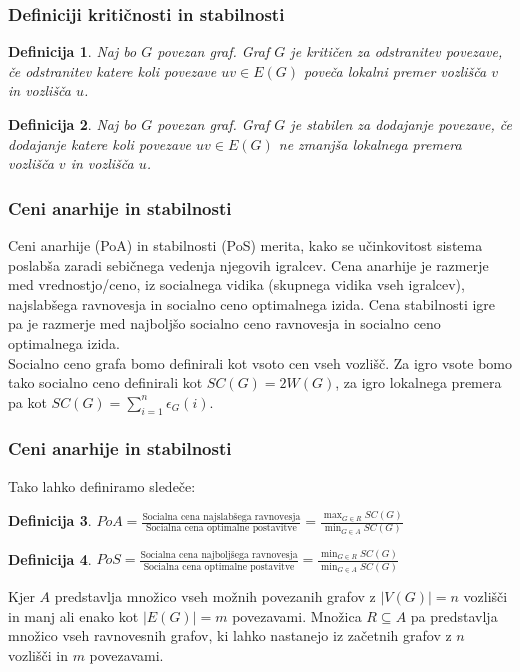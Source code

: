 \documentclass[12pt, hyperref={unicode}]{beamer}
\newtheorem{definicija}{Definicija}
\begin{document}
\begin{frame}
   
    \frametitle{Definiciji kritičnosti in stabilnosti}  
    \begin{definicija}
    Naj bo $G$ povezan graf. Graf $G$ je \textit{kritičen za odstranitev povezave},
    če odstranitev katere koli povezave $uv \in E(G)$ poveča lokalni premer vozlišča $v$ in vozlišča $u$.
    \end{definicija}
    
    \begin{definicija}
    Naj bo $G$ povezan graf. Graf $G$ je \textit{stabilen za dodajanje povezave},
    če dodajanje katere koli povezave $uv \in E(G)$ ne zmanjša lokalnega premera vozlišča $v$ in vozlišča $u$.
    \end{definicija}

\end{frame}

\begin{frame}

  \frametitle{Ceni anarhije in stabilnosti}
  Ceni anarhije (PoA) in stabilnosti (PoS) merita, kako se učinkovitost sistema poslabša zaradi sebičnega vedenja njegovih igralcev.
  Cena anarhije je razmerje med vrednostjo/ceno, iz socialnega vidika (skupnega vidika vseh igralcev), najslabšega ravnovesja in socialno ceno optimalnega izida.
  Cena stabilnosti igre pa je razmerje med najboljšo socialno ceno ravnovesja in socialno ceno optimalnega izida.\\
  Socialno ceno grafa bomo definirali kot vsoto cen vseh vozlišč. Za igro vsote bomo tako socialno ceno definirali kot $SC(G) = 2W(G)$,
  za igro lokalnega premera pa kot $SC(G) = \sum_{i=1}^{n}\epsilon_G(i)$.
\end{frame}

\begin{frame}

  \frametitle{Ceni anarhije in stabilnosti}
  Tako lahko definiramo sledeče:
  \begin{definicija}
    $PoA = \frac{\text{Socialna cena najslabšega ravnovesja}}{\text{Socialna cena optimalne postavitve}} = \frac{\max_{G\in R} SC(G)}{\min_{G\in A} SC(G)}$
  \end{definicija}
  \begin{definicija}
    $PoS = \frac{\text{Socialna cena najboljšega ravnovesja}}{\text{Socialna cena optimalne postavitve}} = \frac{\min_{G\in R} SC(G)}{\min_{G\in A} SC(G)}$
  \end{definicija}
  Kjer $A$ predstavlja množico vseh možnih povezanih grafov z $|V(G)| = n$ vozlišči in manj ali enako kot $|E(G)| = m$ povezavami.
  Množica $R \subseteq A$ pa predstavlja množico vseh ravnovesnih grafov, ki lahko nastanejo iz začetnih grafov z $n$ vozlišči in $m$ povezavami.
\end{frame}
\end{document}
